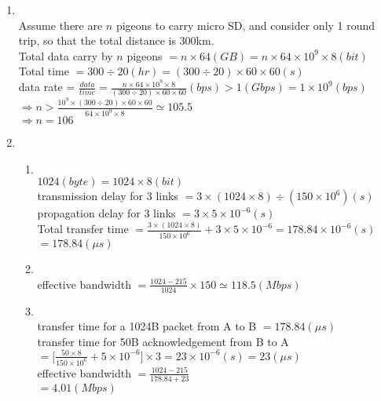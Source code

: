 \documentclass[10pt, a4paper]{article}
\begin{document}
\begin{enumerate}
\item\mbox{}\\
    Assume there are $n$ pigeons to carry micro SD, and consider only 1 round trip, so that the total distance is 300km.\\
    Total data carry by $n$ pigeons $= n \times 64 (GB) = n \times 64 \times 10^9 \times 8 (bit)$\\
    Total time $= 300 \div 20 (hr) = (300 \div 20) \times 60 \times 60 (s)$\\
    data rate = $\frac{data}{time} = \frac{n \times 64 \times 10^9 \times 8}{(300 \div 20) \times 60 \times 60} (bps) > 1 (Gbps) = 1 \times 10^9 (bps)$\\
    $\Rightarrow n > \frac{10^9 \times (300 \div 20) \times 60 \times 60}{64 \times 10^9 \times 8} \simeq 105.5$\\
    $\Rightarrow n = 106$
\item
    \begin{enumerate}
    \item\mbox{}\\
        $1024 (byte) = 1024 \times 8 (bit)$\\
        transmission delay for 3 links $= 3 \times (1024 \times 8) \div (150 \times 10^6) (s)$\\
        propagation delay for 3 links $= 3 \times 5 \times 10^{-6} (s)$\\
        Total transfer time $= \frac{3 \times (1024 \times 8)}{150 \times 10^6} + 3 \times 5 \times 10^{-6} = 178.84 \times 10^{-6} (s)$\\
        $= 178.84 (\mu s)$
    \item\mbox{}\\
        effective bandwidth $= \frac{1024 - 215}{1024} \times 150 \simeq 118.5 (Mbps)$
    \item\mbox{}\\
        transfer time for a 1024B packet from A to B $= 178.84 (\mu s)$\\
        transfer time for 50B acknowledgement from B to A $= \lbrack\frac{50 \times 8}{150 \times 10^6} + 5 \times 10^{-6}\rbrack \times 3 = 23 \times 10^{-6} (s) = 23 (\mu s)$\\
        effective bandwidth $= \frac{1024 - 215}{178.84 + 23}$\\
        $= 4.01 (Mbps)$
    \end{enumerate}


\end{enumerate}
\end{document}
